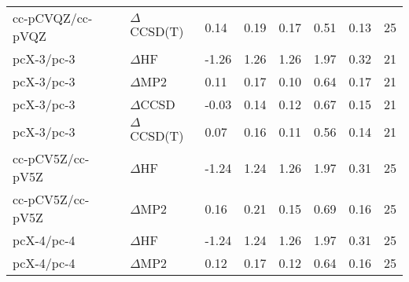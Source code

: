 \begin{table}
\begin{tabular}{l l l l l l l l }
    cc-pCVQZ/cc-pVQZ & $\Delta$CCSD(T) & 0.14 & 0.19 & 0.17 & 0.51 & 0.13 & 25 \\ 
    pcX-3/pc-3 & $\Delta$HF & -1.26 & 1.26 & 1.26 & 1.97 & 0.32 & 21 \\ 
    pcX-3/pc-3 & $\Delta$MP2 & 0.11 & 0.17 & 0.10 & 0.64 & 0.17 & 21 \\ 
    pcX-3/pc-3 & $\Delta$CCSD & -0.03 & 0.14 & 0.12 & 0.67 & 0.15 & 21 \\ 
    pcX-3/pc-3 & $\Delta$CCSD(T) & 0.07 & 0.16 & 0.11 & 0.56 & 0.14 & 21 \\ 
    cc-pCV5Z/cc-pV5Z & $\Delta$HF & -1.24 & 1.24 & 1.26 & 1.97 & 0.31 & 25 \\ 
    cc-pCV5Z/cc-pV5Z & $\Delta$MP2 & 0.16 & 0.21 & 0.15 & 0.69 & 0.16 & 25 \\ 
    pcX-4/pc-4 & $\Delta$HF & -1.24 & 1.24 & 1.26 & 1.97 & 0.31 & 25 \\ 
    pcX-4/pc-4 & $\Delta$MP2 & 0.12 & 0.17 & 0.12 & 0.64 & 0.16 & 25 \\ 
    \bottomrule
  \end{tabular}
\end{table}

